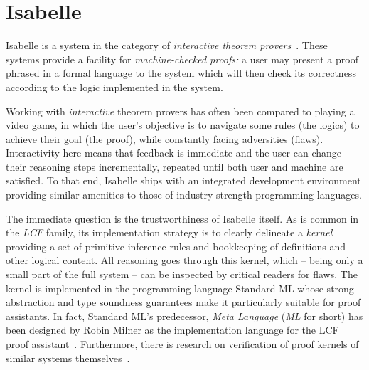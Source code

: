 
\section{Isabelle}
\label{sec:intro:isabelle}

Isabelle is a system in the category of \emph{interactive theorem provers}~\cite{nipkow2014semantics}.
These systems provide a facility for \emph{machine-checked proofs:} a user may present a proof phrased in a formal language to the system which will then check its correctness according to the logic implemented in the system.

Working with \emph{interactive} theorem provers has often been compared to playing a video game, in which the user's objective is to navigate some rules (the logics) to achieve their goal (the proof), while constantly facing adversities (flaws).
Interactivity here means that feedback is immediate and the user can change their reasoning steps incrementally, repeated until both user and machine are satisfied.
To that end, Isabelle ships with an integrated development environment providing similar amenities to those of industry-strength programming languages.

The immediate question is the trustworthiness of Isabelle itself.
As is common in the \emph{LCF} family, its implementation strategy is to clearly delineate a \emph{kernel} providing a set of primitive inference rules and bookkeeping of definitions and other logical content.
All reasoning goes through this kernel, which -- being only a small part of the full system -- can be inspected by critical readers for flaws.
The kernel is implemented in the programming language Standard ML whose strong abstraction and type soundness guarantees make it particularly suitable for proof assistants.
In fact, Standard ML's predecessor, \emph{Meta Language} (\emph{ML} for short) has been designed by Robin Milner as the implementation language for the LCF proof assistant~\cite[§6]{plotkin2000milner}.
Furthermore, there is research on verification of proof kernels of similar systems themselves~\cite{kumar2016phd,kumar2016self}.